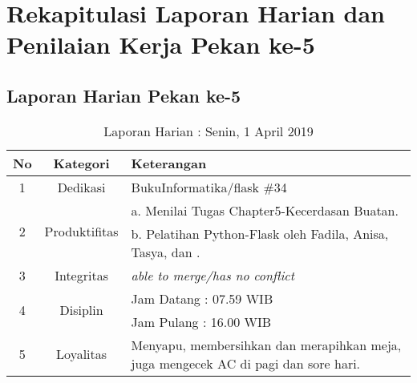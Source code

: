 \section{Rekapitulasi Laporan Harian dan Penilaian Kerja Pekan ke-5}

\subsection{Laporan Harian Pekan ke-5}

\begin{table}[htp]
\begin{center}
\caption{Laporan Harian : Senin, 1 April 2019}
\label{tab:lh010419}
\begin{tabularx}{\textwidth}{|l|l|X|}
\hline
\multicolumn{1}{|c|}{\textbf{No}} & \multicolumn{1}{c|}{\textbf{Kategori}} & \textbf{Keterangan} \\ \hline
\multicolumn{1}{|c|}{\multirow{1}{*}{1}} & \multicolumn{1}{c|}{\multirow{1}{*}{\parbox{2.5cm}{Dedikasi}}}
& BukuInformatika/flask \#34\\
\hline
\multicolumn{1}{|c|}{\multirow{2}{*}{2}} & \multicolumn{1}{c|}{\multirow{2}{*}{\parbox{2.5cm}{Produktifitas}}}
& a. Menilai Tugas Chapter5-Kecerdasan Buatan.\\
\multicolumn{1}{|c|}{\multirow{1}{*}{}} & \multicolumn{1}{c|}{\multirow{1}{*}{\parbox{2.5cm}{}}}
& b. Pelatihan Python-Flask oleh Fadila, Anisa, Tasya, dan .\\
\hline
\multicolumn{1}{|c|}{\multirow{1}{*}{3}} & \multicolumn{1}{c|}{\multirow{1}{*}{\parbox{2.5cm}{Integritas}}}
& \textit{able to merge/has no conflict} \\
\hline
\multicolumn{1}{|c|}{\multirow{2}{*}{4}} & \multicolumn{1}{c|}{\multirow{2}{*}{\parbox{2.5cm}{Disiplin}}}
& Jam Datang : 07.59 WIB \\
\multicolumn{1}{|c|}{\multirow{1}{*}{}} & \multicolumn{1}{c|}{\multirow{1}{*}{\parbox{2.5cm}{}}}
& Jam Pulang : 16.00 WIB \\
\hline
\multicolumn{1}{|c|}{\multirow{2}{*}{5}} & \multicolumn{1}{c|}{\multirow{2}{*}{\parbox{2.5cm}{Loyalitas}}}
& Menyapu, membersihkan dan merapihkan meja, juga mengecek AC di pagi dan sore hari.\\
\hline
\end{tabularx}
\end{center}
\end{table}

